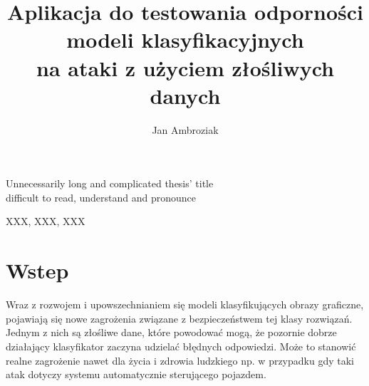 \documentclass[
    left=2.5cm,         %
    right=2.5cm,        %
    top=2.5cm,          %
    bottom=3cm,         %
    bindingoffset=6mm,  %
    nohyphenation=false %
]{eiti/eiti-thesis}
\begin{document}
\EngineerThesis %
{}
\title
{
    Aplikacja do testowania odporności modeli klasyfikacyjnych \\
    na ataki z użyciem złośliwych danych \\
}

\engtitle
{ %
    Unnecessarily long and complicated thesis' title \\
    difficult to read, understand and pronounce
}

\author{Jan Ambroziak}
\date{\the\year}
\maketitle

\cleardoublepage %
\streszczenie \lipsum[1-3]
\slowakluczowe XXX, XXX, XXX

\cleardoublepage  %
\pagestyle{plain}
\makeauthorship

\cleardoublepage %
\tableofcontents

\cleardoublepage %
\pagestyle{headings}

\section{Wstep}






Wraz z rozwojem i upowszechnianiem się modeli klasyfikujących obrazy graficzne,
pojawiają się nowe zagrożenia związane z bezpieczeństwem tej klasy rozwiązań.
Jednym z nich są złośliwe dane, które powodować mogą,
że pozornie dobrze działający klasyfikator zaczyna udzielać błędnych odpowiedzi.
Może to stanowić realne zagrożenie nawet dla życia i zdrowia ludzkiego
np. w przypadku gdy taki atak dotyczy systemu automatycznie sterującego pojazdem.
\end{document}
